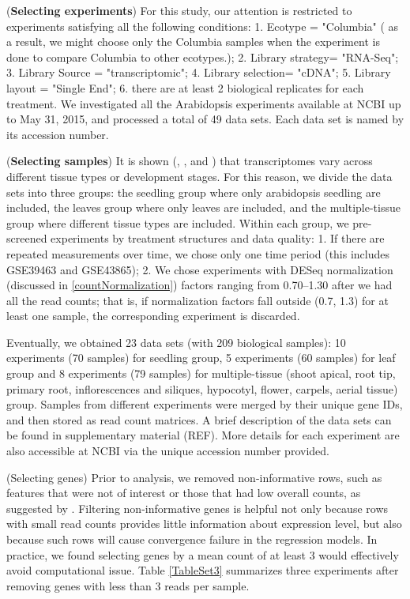 \documentclass[11pt, a4paper]{article}
\begin{document}
  (\textbf{Selecting experiments}) For this study, our attention is restricted to experiments satisfying all the following conditions:  1. Ecotype = "Columbia" ( as a result, we might choose only the Columbia samples when the experiment is done to compare Columbia to other ecotypes.); 2. Library strategy= "RNA-Seq"; 3. Library Source = "transcriptomic"; 4. Library selection= "cDNA"; 5. Library layout = "Single End"; 6. there are at least 2 biological replicates for each treatment. We investigated all the Arabidopsis experiments available at NCBI up to May 31, 2015, and processed a total of 49 data sets. Each data set is named by its accession number. 
    

  
   
   
  (\textbf{Selecting samples}) It is shown (\citep{czechowski2005genome}, \citep{hruz2011refgenes}, and
   \citep{dekkers2012identification}) that transcriptomes vary across different tissue types or development stages. For this reason, we divide the data sets into three groups: the seedling group where only arabidopsis seedling are included, the leaves group where only leaves are included, and the multiple-tissue group where different tissue types are included. Within each group, we pre-screened experiments by treatment structures and data quality: 1. If there are repeated measurements over time, we chose only one time period (this includes GSE39463 and GSE43865); 2. We chose experiments with DESeq normalization (discussed in \ref{countNormalization}) factors ranging from 0.70--1.30 after we had all the read counts; that is, if normalization factors fall outside (0.7, 1.3) for at least one sample, the corresponding experiment is discarded. 
   
    Eventually, we obtained 23 data sets (with 209 biological samples): 10 experiments (70 samples) for seedling group, 5 experiments (60 samples) for leaf group and 8 experiments (79 samples) for multiple-tissue (shoot apical,  root tip, primary root, inflorescences and siliques, hypocotyl, flower, carpels, aerial tissue) group. Samples from different experiments were merged by their unique gene IDs, and then stored as read count matrices. A brief description of the data sets can be found in supplementary material (REF). More details for each experiment are also accessible at NCBI via the unique accession number provided.
   
   
	 (Selecting genes) Prior to analysis, we removed non-informative rows, such as features that were not of interest or those that had low overall counts, as suggested by \cite{anders2013count}. Filtering non-informative genes is helpful not only because rows with small read counts provides little information about expression level,  but also because such rows will cause convergence failure in the regression models. In practice,  we found selecting genes by a mean count of at least 3 would effectively avoid computational issue.  Table \ref{TableSet3} summarizes three experiments after removing genes with less than 3 reads per sample.
   
\end{document}

